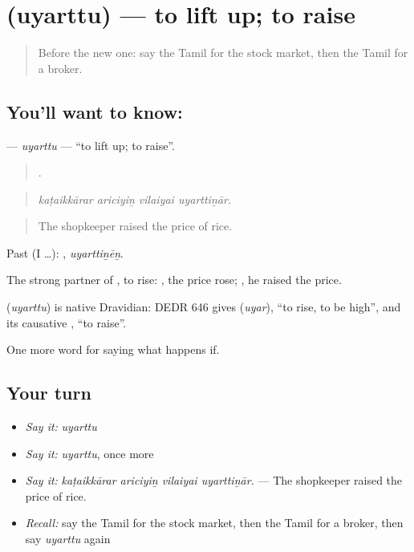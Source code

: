 \section[\texorpdfstring{\ta{உயர்த்து} (uyarttu)}{உயர்த்து (uyarttu)}]{ (uyarttu) — to lift up; to raise}

\label{lesson:TA-C545-uyarttu}



\begin{quote}
Before the new one: say the Tamil for the stock market, then the Tamil for a broker.
\end{quote}

\subsection*{You'll want to know: }
\textbf{} — \emph{uyarttu} — \textquotedblleft{}to lift up; to raise\textquotedblright{}.

\begin{quote}
   .
\end{quote}

\begin{quote}
\emph{kaṭaikkārar ariciyiṉ vilaiyai uyarttiṉār.}
\end{quote}

\begin{quote}
The shopkeeper raised the price of rice.
\end{quote}

Past (I …): , \emph{uyarttiṉēṉ}.

The strong partner of , to rise:  , the price rose;  , he raised the price.

\begin{cousinweb}
\textbf{} (\emph{uyarttu}) is native Dravidian: DEDR 646 gives  (\emph{uyar}), \textquotedblleft{}to rise, to be high\textquotedblright{}, and its causative , \textquotedblleft{}to raise\textquotedblright{}.
\end{cousinweb}

\begin{grammarlens}[title={What you've built}]
One more word for saying what happens if.
\end{grammarlens}

\subsection*{Your turn}
\begin{itemize}
\raggedright
  \item \emph{Say it:} \emph{uyarttu}
  \item \emph{Say it:} \emph{uyarttu}, once more
  \item \emph{Say it:} \emph{kaṭaikkārar ariciyiṉ vilaiyai uyarttiṉār.} — The shopkeeper raised the price of rice.
  \item \emph{Recall:} say the Tamil for the stock market, then the Tamil for a broker, then say \emph{uyarttu} again
\end{itemize}

